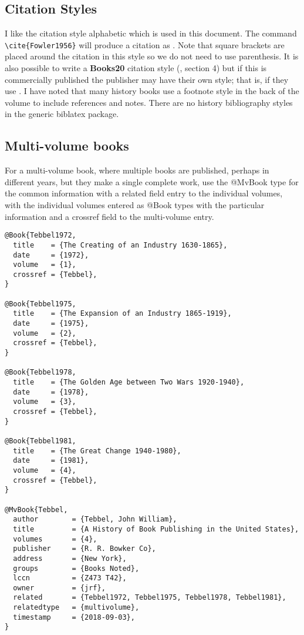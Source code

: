 \documentclass{article}
\begin{document}
\subsection{Citation Styles}

I like the citation style {\ttfamily alphabetic} which is used in this
document. The command \verb|\cite{Fowler1956}| will produce a
citation as \cite{Fowler1956}. Note that square brackets are placed
around the citation in this style so we do not need to use
parenthesis. It is also possible to write a {\bfseries Books20}
citation style (\cite{Kime2019}, section 4) but if this is
commercially published the publisher may have their own style; that
is, if they use \LaTeXe.  I have noted that many history books use a
footnote style in the back of the volume to include references and
notes. There are no history bibliography styles in the generic
{\ttfamily biblatex} package.

\subsection{Multi-volume books}

For a multi-volume book, where multiple books are published, perhaps
in different years, but they make a single complete work, use the
{\ttfamily @MvBook} type for the common information with a {\ttfamily
  related} field entry to the individual volumes, with the individual
volumes entered as {\ttfamily @Book} types with the particular
information and a {\ttfamily crossref} field to the multi-volume
entry.

\begin{verbatim}
@Book{Tebbel1972,
  title    = {The Creating of an Industry 1630-1865},
  date     = {1972},
  volume   = {1},
  crossref = {Tebbel},
}

@Book{Tebbel1975,
  title    = {The Expansion of an Industry 1865-1919},
  date     = {1975},
  volume   = {2},
  crossref = {Tebbel},
}

@Book{Tebbel1978,
  title    = {The Golden Age between Two Wars 1920-1940},
  date     = {1978},
  volume   = {3},
  crossref = {Tebbel},
}

@Book{Tebbel1981,
  title    = {The Great Change 1940-1980},
  date     = {1981},
  volume   = {4},
  crossref = {Tebbel},
}

@MvBook{Tebbel,
  author        = {Tebbel, John William},
  title         = {A History of Book Publishing in the United States},
  volumes       = {4},
  publisher     = {R. R. Bowker Co},
  address       = {New York},
  groups        = {Books Noted},
  lccn          = {Z473 T42},
  owner         = {jrf},
  related       = {Tebbel1972, Tebbel1975, Tebbel1978, Tebbel1981},
  relatedtype   = {multivolume},
  timestamp     = {2018-09-03},
}
\end{verbatim}
\end{document}
